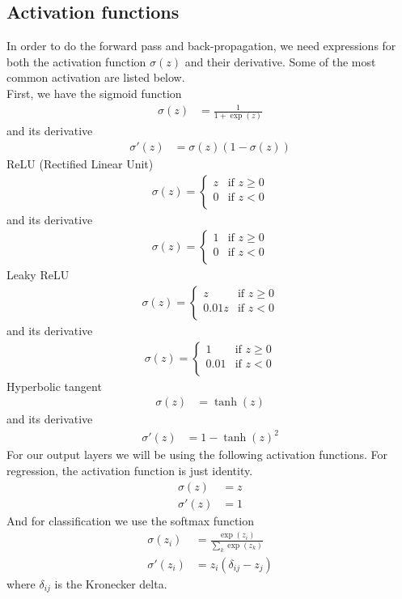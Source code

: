 \documentclass[a4paper]{article}
\begin{document}
\subsection{Activation functions}\label{sec:act_fun}
In order to do the forward pass and back-propagation, we need expressions for both the activation function $\sigma(z)$ and their derivative. Some of the most common activation are listed below.\\
First, we have the sigmoid function
\begin{align*}
	\sigma(z) &= \frac{1}{1+\exp(z)}
\end{align*}
and its derivative
\begin{align*}
	\sigma'(z) &= \sigma(z)(1-\sigma(z))
\end{align*}
ReLU (Rectified Linear Unit)
\begin{align*}
    \sigma(z) = 
    \begin{cases}
        z & \text{if } z \geq 0 \\
        0 & \text{if } z < 0 \\
    \end{cases}
\end{align*}
and its derivative
\begin{align*}
    \sigma(z) = 
    \begin{cases}
        1 & \text{if } z \geq 0 \\
        0 & \text{if } z < 0 \\
    \end{cases}
\end{align*}
Leaky ReLU
\begin{align*}
    \sigma(z) = 
    \begin{cases}
        z & \text{if } z \geq 0 \\
        0.01z & \text{if } z < 0 \\
    \end{cases}
\end{align*}
and its derivative
\begin{align*}
    \sigma(z) = 
    \begin{cases}
        1 & \text{if } z \geq 0 \\
        0.01 & \text{if } z < 0 \\
    \end{cases}
\end{align*}
Hyperbolic tangent
\begin{align*}
	\sigma(z) &= \tanh(z)
\end{align*}
and its derivative
\begin{align*}
	\sigma'(z) &= 1-\tanh(z)^2
\end{align*}
For our output layers we will be using the following activation functions. For regression, the activation function is just identity.
\begin{align*}
	\sigma(z) &= z\\
	\sigma'(z) &= 1
\end{align*}
And for classification we use the softmax function
\begin{align*}
	\sigma(z_i) &= \frac{\exp(z_i)}{\sum_k\exp(z_k)}\\
	\sigma'(z_i) &= z_i(\delta_{ij} - z_j)
\end{align*}
where $\delta_{ij}$ is the Kronecker delta.
\end{document}
